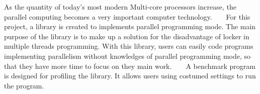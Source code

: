 As the quantity of today’s most modern Multi-\/core processors \cite{multiple-corearchitectures} increase, the parallel computing becomes a very important computer technology. ~\newline
~\newline
For this project, a library is created to implements parallel programming mode. The main purpose of the library is to make up a solution for the disadvantage of locker in multiple threads programming. With this library, users can easily code programs implementing parallelism without knowledges of parallel programming mode, so that they have more time to focus on they main work. ~\newline
~\newline
A benchmark program is designed for profiling the library. It allows users using costumed settings to run the program. 